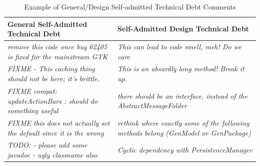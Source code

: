 \documentclass[conference]{IEEEtran}
\begin{document}
\begin{table}[!hbt]
	\begin{center}
		\caption{Example of General/Design Self-admitted Technical Debt Comments}
		\vspace{-2mm}
		\label{tab:satdmotivation}
		\begin{tabular}{ p{3in} | p{3in} } 
			\toprule
			\textbf{General Self-Admitted Technical Debt} &  \textbf{Self-Admitted Design Technical Debt}  \\ 
			\midrule
			\textit{remove this code once bug 62405 is fixed for the mainstream GTK} & \textit{This can lead to code smell, meh! Do we care}\\
			\textit{FIXME - This caching thing should not be here; it's brittle.} & \textit{This is an absurdly long method! Break it up.}\\
			\textit{FIXME compat: updateActionBars : should do something useful} & \textit{there should be an interface, instead of the 		AbstractMessageFolder}\\
			\textit{FIXME this does not actually set the default since it is the wrong} & \textit{rethink where exactly some of the following methods belong (GenModel or GenPackage)}\\
			\textit{TODO: - please add some javadoc - ugly classname also} & \textit{Cyclic dependency with PersistenceManager}\\


\end{tabular}
\end{center}
\end{table}
\end{document}

